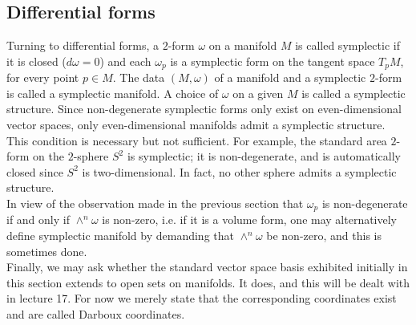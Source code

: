 \documentclass[11pt]{article} %
\begin{document}
\subsection*{Differential forms}
Turning to differential forms, a $2$-form $\omega$ on a manifold $M$ is called symplectic if it is closed ($d\omega = 0$) and each $\omega_p$ is a symplectic form on the tangent space $T_pM$, for every point $p\in M$. The data $(M, \omega)$ of a manifold and a symplectic $2$-form is called a symplectic manifold. A choice of $\omega$ on a given $M$ is called a symplectic structure. Since non-degenerate symplectic forms only exist on even-dimensional vector spaces, only even-dimensional manifolds admit a symplectic structure. This condition is necessary but not sufficient. For example, the standard area $2$-form on the $2$-sphere $S^2$ is symplectic; it is non-degenerate, and is automatically closed since $S^2$ is two-dimensional. In fact, no other sphere admits a symplectic structure.\\
In view of the observation made in the previous section that $\omega_p$ is non-degenerate if and only if $\wedge^n\omega$ is non-zero, i.e. if it is a volume form, one may alternatively define symplectic manifold by demanding that $\wedge^n\omega$ be non-zero, and this is sometimes done.\\
Finally, we may ask whether the standard vector space basis exhibited initially in this section extends to open sets on manifolds. It does, and this will be dealt with in lecture 17. For now we merely state that the corresponding coordinates exist and are called Darboux coordinates.
\end{document}
